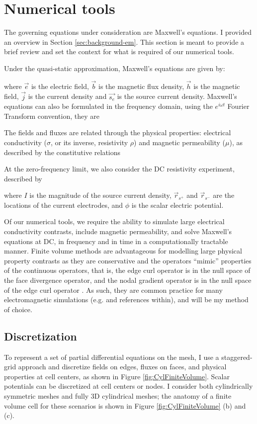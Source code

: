 \section{Numerical tools}
\label{sec:numerical_tools}

The governing equations under consideration are Maxwell's equations. I provided an overview in Section \ref{sec:background-em}. This section is meant to provide a brief review and set the context for what is required of our numerical tools.

Under the quasi-static approximation, Maxwell's equations are given by:

where $\vec{e}$ is the electric field, $\vec{b}$ is the magnetic flux density, $\vec{h}$ is the magnetic field, $\vec{j}$ is the current density and $\vec{s_e}$ is the source current density. Maxwell's equations can also be formulated in the frequency domain, using the $e^{i \omega t}$ Fourier Transform convention, they are

The fields and fluxes are related through the physical properties: electrical conductivity ($\sigma$, or its inverse, resistivity $\rho$) and magnetic permeability ($\mu$), as described by the constitutive relations

At the zero-frequency limit, we also consider the DC resistivity experiment, described by

where $I$ is the magnitude of the source current density, $\vec{r}_{s^+}$ and $\vec{r}_{s^-}$ are the locations of the current electrodes, and $\phi$ is the scalar electric potential.

Of our numerical tools, we require the ability to simulate large electrical conductivity contrasts, include magnetic permeability, and solve Maxwell’s equations at DC, in frequency and in time in a computationally tractable manner. Finite volume methods are advantageous for modelling large physical property contrasts as they are conservative and the operators ``mimic'' properties of the continuous operators, that is, the edge curl operator is in the null space of the face divergence operator, and the nodal gradient operator is in the null space of the edge curl operator \citep{Hyman1999}. As such, they are common practice for many electromagnetic simulations (e.g. \cite{Horesh2011, Haber2014, Jahandari2014} and references within), and will be my method of choice.
\subsection{Discretization}
To represent a set of partial differential equations on the mesh, I use a staggered-grid approach \citep{Yee1966} and discretize fields on edges, fluxes on faces, and physical properties at cell centers, as shown in Figure \ref{fig:CylFiniteVolume}. Scalar potentials can be discretized at cell centers or nodes. I consider both cylindrically symmetric meshes and fully 3D cylindrical meshes; the anatomy of a finite volume cell for these scenarios is shown in Figure \ref{fig:CylFiniteVolume} (b) and (c).


